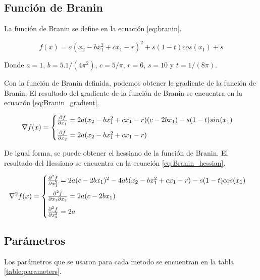\subsection{Función de Branin}

La función de Branin se define en la ecuación \ref{eq:branin}.

\begin{equation}
    f(x) = a(x_2-bx_1^2+cx_1-r)^2 + s(1-t)cos(x_1)+s
    \label{eq:branin}
\end{equation}

Donde $a=1$, $b=5.1/(4\pi^2)$, $c=5/\pi$, $r=6$, $s=10$ y $t=1/(8\pi)$.

Con la función de Branin definida, podemos obtener le gradiente de la función de Branin. El resultado del gradiente de la función de Branin se encuentra en la ecuación \ref{eq:Branin_gradient}.

\begin{equation}
    \nabla f(x) = \begin{cases}
        \frac{\partial f}{\partial x_1}=2a(x_2-bx_1^2+cx_1-r)(c-2bx_1) - s(1-t)sin(x_1) \\[0.25cm]
        \frac{\partial f}{\partial x_2}=2a(x_2-bx_1^2+cx_1-r)
    \end{cases} \label{eq:Branin_gradient}
\end{equation}

De igual forma, se puede obtener el hessiano de la función de Branin. El resultado del Hessiano se encuentra en la ecuación \ref{eq:Branin_hessian}.

\begin{equation}
    \nabla^2 f(x) = \begin{cases}
        \frac{\partial^2 f}{\partial x_1^2} = 2a(c-2bx_1)^2 -4ab(x_2-bx_1^2+cx_1-r)-s(1-t)cos(x_1) \\[0.25cm]
        \frac{\partial^2 f}{\partial x_1 \partial x_2} =2a(c-2bx_1)                                      \\[0.25cm]
        \frac{\partial^2 f}{\partial x_2^2} = 2a                                                   \\
    \end{cases} \label{eq:Branin_hessian}
\end{equation}

\subsection{Parámetros}

Los parámetros que se usaron para cada metodo se encuentran en la tabla \ref{table:parameters}.


